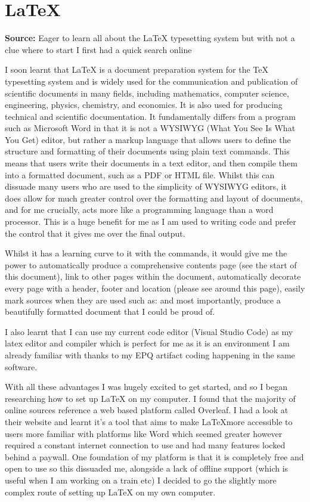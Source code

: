 \section{\LaTeX{}}
\label{research:Latex}
\textbf{Source:} \cite{DocumentationOverleafOnline} \cite{MacTeXTeXUsers}
Eager to learn all about the \LaTeX{} typesetting system but with not a clue where to start I first had a quick search online

I soon learnt that \LaTeX{} is a document preparation system for the \TeX{} typesetting system and is widely used for the communication and publication of scientific documents in many fields, including mathematics, computer science, engineering, physics, chemistry, and economics. It is also used for producing technical and scientific documentation. It fundamentally differs from a program such as Microsoft Word in that it is not a WYSIWYG (What You See Is What You Get) editor, but rather a markup language that allows users to define the structure and formatting of their documents using plain text commands. This means that users write their documents in a text editor, and then compile them into a formatted document, such as a PDF or HTML file. Whilst this can dissuade many users who are used to the simplicity of WYSIWYG editors, it does allow for much greater control over the formatting and layout of documents, and for me crucially, acts more like a programming language than a word processor. This is a huge benefit for me as I am used to writing code and prefer the control that it gives me over the final output.

Whilst it has a learning curve to it with the commands, it would give me the power to automatically produce a comprehensive contents page (see the start of this document), link to other pages within the document, automatically decorate every page with a header, footer and location (please see around this page), easily mark sources when they are used such as: \cite{DocumentationOverleafOnline} and most importantly, produce a beautifully formatted document that I could be proud of.

I also learnt that I can use my current code editor (Visual Studio Code) as my latex editor and compiler which is perfect for me as it is an environment I am already familiar with thanks to my EPQ artifact coding happening in the same software. 

With all these advantages I was hugely excited to get started, and so I began researching how to set up \LaTeX{} on my computer. I found that the majority of online sources reference a web based platform called Overleaf. I had a look at their website and learnt it's a tool that aims to make \LaTeX more accessible to users more familiar with platforms like Word which seemed greater however required a constant internet connection to use and had many features locked behind a paywall. One foundation of my platform is that it is completely free and open to use so this dissuaded me, alongside a lack of offline support (which is useful when I am working on a train etc) I decided to go the slightly more complex route of setting up \LaTeX{} on my own computer.

